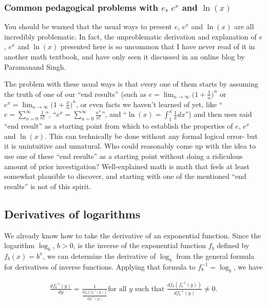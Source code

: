 \subsubsection*{Common pedagogical problems with $e$, $e^x$ and $\ln(x)$}

You should be warned that the usual ways to present $e$, $e^x$ and $\ln(x)$ are all incredibly problematic. In fact, the unproblematic derivation and explanation of $e$, $e^x$ and $\ln(x)$ presented here is so uncommon that I have never read of it in another math textbook, and have only seen it discussed in an online blog by Paramanand Singh.

The problem with these usual ways is that every one of them starts by assuming the truth of one of our ``end results'' (such as $e = \lim_{n \rightarrow \infty} \Big(1 + \frac{1}{n} \Big)^n$ or $e^x = \lim_{n \rightarrow \infty} \Big(1 + \frac{x}{n} \Big)^n$, or even facts we haven't learned of yet, like ``$e = \sum_{n = 0}^\infty \frac{1}{n!}$'', ``$e^x = \sum_{n = 0}^\infty \frac{x^n}{n!}$'', and ``$\ln(x) = \int_1^x \frac{1}{x} dx$'') and then uses said ``end result'' as a starting point from which to establish the properties of $e$, $e^x$ and $\ln(x)$. This can technically be done without any formal logical error- but it is unintuitive and unnatural. Who could reasonably come up with the idea to use one of these ``end results'' as a starting point without doing a ridiculous amount of prior investigation? Well-explained math is math that feels at least somewhat plausible to discover, and starting with one of the mentioned ``end results'' is not of this spirit.

\subsection*{Derivatives of logarithms}

We already know how to take the derivative of an exponential function. Since the logarithm $\log_b$, $b > 0$, is the inverse of the exponential function $f_b$ defined by $f_b(x) = b^x$, we can determine the derivative of $\log_b$ from the general formula for derivatives of inverse functions. Applying that formula to $f_b^{-1} = \log_b$, we have

\begin{align*}
    \frac{df_b^{-1}(y)}{dy} = \frac{1}{\frac{df_b(f_b^{-1}(y))}{df_b^{-1}(y)}} \text{for all $y$ such that $\frac{df_b(f_b^{-1}(y))}{df_b^{-1}(y)} \neq 0$}.
\end{align*}

